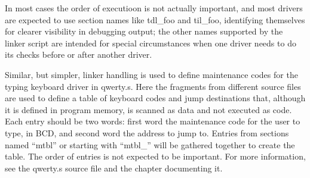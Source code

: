 In most cases the order of executioon is not actually important, and most
drivers are expected to use section names like tdl\_foo and til\_foo,
identifying themselves for clearer visibility in debugging output; the other
names supported by the linker script are intended for special circumstances
when one driver needs to do its checks before or after another driver.

Similar, but simpler, linker handling is used to define maintenance codes
for the typing keyboard driver in qwerty.s.  Here the fragments from
different source files are used to define a table of keyboard codes and jump
destinations that, although it is defined in program memory, is scanned as
data and not executed as code.  Each entry should be two words: first word
the maintenance code for the user to type, in BCD, and second word the
address to jump to.  Entries from sections named ``mtbl'' or starting with
``mtbl\_'' will be gathered together to create the table.  The order of
entries is not expected to be important.  For more information, see the
qwerty.s source file and the chapter documenting it.
